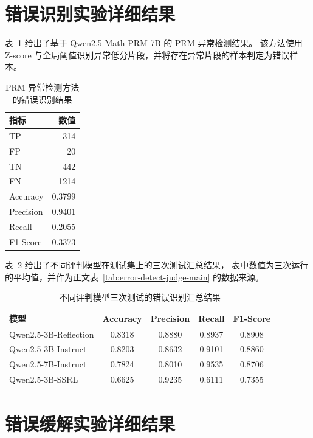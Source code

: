 \section{错误识别实验详细结果}

表~\ref{tab:appendix-error-detect-prm} 给出了基于 Qwen2.5-Math-PRM-7B 的 PRM 异常检测结果。
该方法使用 Z-score 与全局阈值识别异常低分片段，并将存在异常片段的样本判定为错误样本。

\begin{table}[htbp]
\caption{PRM 异常检测方法的错误识别结果}
\label{tab:appendix-error-detect-prm}
\vspace{0.5em}\centering\wuhao
\begin{tabular}{lr}
\toprule
指标 & 数值 \\
\midrule
TP & 314 \\
FP & 20 \\
TN & 442 \\
FN & 1214 \\
Accuracy & 0.3799 \\
Precision & 0.9401 \\
Recall & 0.2055 \\
F1-Score & 0.3373 \\
\bottomrule
\end{tabular}
\end{table}

表~\ref{tab:appendix-error-detect-judge} 给出了不同评判模型在测试集上的三次测试汇总结果，
表中数值为三次运行的平均值，并作为正文表~\ref{tab:error-detect-judge-main} 的数据来源。

\begin{table}[htbp]
\caption{不同评判模型三次测试的错误识别汇总结果}
\label{tab:appendix-error-detect-judge}
\vspace{0.5em}\centering\wuhao
\begin{tabular}{lcccc}
\toprule
模型 & Accuracy & Precision & Recall & F1-Score \\
\midrule
Qwen2.5-3B-Reflection & 0.8318 & 0.8880 & 0.8937 & 0.8908 \\
Qwen2.5-3B-Instruct & 0.8203 & 0.8632 & 0.9101 & 0.8860 \\
Qwen2.5-7B-Instruct & 0.7824 & 0.8010 & 0.9535 & 0.8706 \\
Qwen2.5-3B-SSRL & 0.6625 & 0.9235 & 0.6111 & 0.7355 \\
\bottomrule
\end{tabular}
\end{table}

\section{错误缓解实验详细结果}

